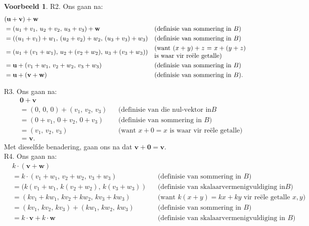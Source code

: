 \documentclass[a4paper,11pt]{book}
\theoremstyle{definition}
\newtheorem{example_environment}{Voorbeeld}[chapter]
\newcommand{\ve}[1]{\mathbf{#1}}
\newenvironment{example}
	{
		\begin{oframed}
		\begin{example_environment}
	}
	{
		\end{example_environment}
		\end{oframed}
	}
\begin{document}
\begin{example}
\noindent R2. Ons gaan na:
\begin{align*}
	& (\ve{u} + \ve{v}) + \ve{w} \\
	&= ( u_1 + v_1, \, u_2 + v_2, \, u_3 + v_3) + \ve{w} &&
	\mbox{(definisie van sommering in $B$)} \\
	&= ( (u_1 + v_1) + w_1, \, (u_2 + v_2) + w_2, \, (u_3 + v_3) + w_3) &&
	\mbox{(definisie van sommering in $B$)} \\
	&= ( u_1 + (v_1 + w_1), \, u_2 + (v_2 + w_2), \, u_3 + (v_3 + w_3)) &&
	\mbox{\begin{minipage}{5cm}(want $(x + y) + z = x + (y + z)$ is waar
	vir re{\"e}le getalle)\end{minipage}}  \\
		&= \ve{u} + (v_1 + w_1, \, v_2 + w_2, \, v_3 + w_3) &&
		\mbox{(definisie van sommering in $B$)} \\
	&= \ve{u} + (\ve{v} + \ve{w}) && \mbox{(definisie van sommering in
	$B$)}.
\end{align*}

\noindent R3. Ons gaan na:
\begin{align*}
	&\ve{0} + \ve{v}  \\
	&= ( 0, \, 0, \, 0) + (v_1, \, v_2, \, v_3) && \mbox{(definisie van die
	nul-vektor in$B$}\\
	&= (0 + v_1, \, 0 + v_2, \, 0 + v_3) && \mbox{(definisie van sommering
	in $B$)} \\
	&= (v_1, \, v_2, \, v_3) && \mbox{(want $x + 0 = x$ is waar vir
	re{\"e}le getalle)} \\
	&= \ve{v}.
\end{align*}
Met dieselfde benadering, gaan ons na dat $\ve{v} + \ve{0} = \ve{v}$. \\

\noindent R4. Ons gaan na:
\begin{align*}
	& k \cdot ( \ve{v + w} ) \\
	&= k \cdot (v_1 + w_1, \, v_2 + w_2, \, v_3 + w_3) && \mbox{(definisie
	van sommering in $B$)} \\
	&= (k (v_1 + w_1, \, k (v_2 + w_2), \, k (v_3 + w_3) ) &&
	\mbox{(definisie van skalaarvermenigvuldiging in$B$)} \\
	&= (kv_1 + kw_1, \, kv_2 + kw_2, \, kv_3 + kw_3) && \mbox{(want $k(x+y)
	= kx + ky$ vir re{\"e}le getalle $x,y$)} \\
	&= (kv_1, \, kv_2, \, kv_3) + (kw_1, \, kw_2,\, kw_3) &&
	\mbox{(definisie van sommering in $B$)} \\
	&= k \cdot \ve{v} + k \cdot \ve{w} && \mbox{(definisie van
	skalaarvermenigvuldiging in $B$)}
\end{align*}


\end{example}
\end{document}
